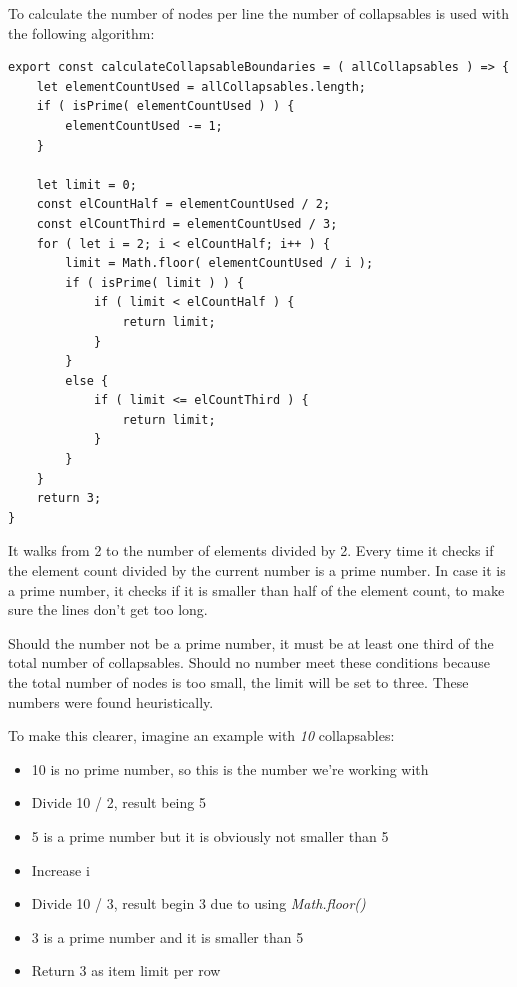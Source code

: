To calculate the number of nodes per line the number of collapsables is used with the following algorithm:
\lstset{language=JavaScript}
\begin{lstlisting}[caption={Algorithm to determine the number of Collapsables per Row}]
export const calculateCollapsableBoundaries = ( allCollapsables ) => {
	let elementCountUsed = allCollapsables.length;
	if ( isPrime( elementCountUsed ) ) {
		elementCountUsed -= 1;
	}

	let limit = 0;
	const elCountHalf = elementCountUsed / 2;
	const elCountThird = elementCountUsed / 3;
	for ( let i = 2; i < elCountHalf; i++ ) {
		limit = Math.floor( elementCountUsed / i );
		if ( isPrime( limit ) ) {
			if ( limit < elCountHalf ) {
				return limit;
			}
		}
		else {
			if ( limit <= elCountThird ) {
				return limit;
			}
		}
	}
	return 3;
}
\end{lstlisting}

It walks from 2 to the number of elements divided by 2. Every time it checks if the element count divided by the current number is a prime number. In case it is a prime number, it checks if it is smaller than half of the element count, to make sure the lines don't get too long.

Should the number not be a prime number, it must be at least one third of the total number of collapsables. Should no number meet these conditions because the total number of nodes is too small, the limit will be set to three. These numbers were found heuristically.

To make this clearer, imagine an example with \emph{10} collapsables:
\begin{itemize}
\item 10 is no prime number, so this is the number we're working with
\item Divide 10 / 2, result being 5
\item 5 is a prime number but it is obviously not smaller than 5
\item Increase i
\item Divide 10 / 3, result begin 3 due to using \emph{Math.floor()}
\item 3 is a prime number and it is smaller than 5
\item Return 3 as item limit per row
\end{itemize}

